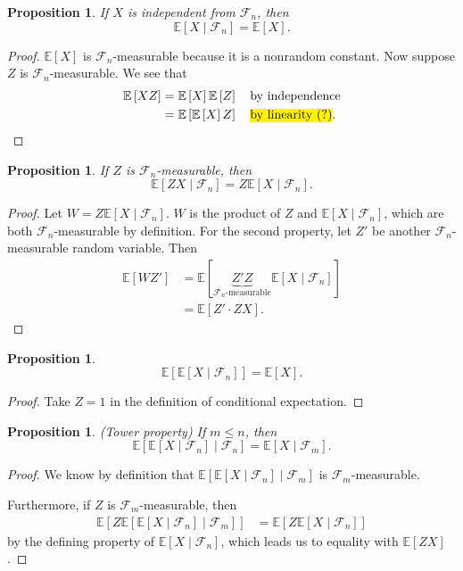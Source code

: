 \documentclass{tufte-handout}
\newcommand*\E{\mathbb{E}}
\newtheorem{prop}[thm]{Proposition}
\theoremstyle{definition}
\begin{document}
\begin{prop}
	If $X$ is independent from $\mathscr{F}_n$, then \[
		\E\left[X \mid \mathscr{F}_n\right]  = \E\left[X\right] 
	.\] 
\end{prop}
\begin{proof}
	$\E\left[X\right]$ is $\mathscr{F}_n$-measurable because it is a nonrandom constant.
	Now suppose $Z$ is $\mathscr{F}_n$-measurable. We see that
	\begin{align*}
		\E\left[XZ\right]  &= \E\left[X\right] \E\left[Z\right] \quad \text{by independence} \\
						   &= \E\left[\E\left[X \right] Z\right] \quad \text{\texthl{by linearity (?)}}
	.\end{align*}
\end{proof}

\begin{prop}
	If $Z$ is $\mathscr{F}_n$-measurable, then \[
		\E\left[ZX \mid \mathscr{F}_n\right] = Z \E\left[X \mid \mathscr{F}_n\right] 
	.\] 
\end{prop}

\begin{proof}
	Let $W = Z \E\left[X \mid \mathscr{F}_n\right] $.
	$W$ is the product of $Z$ and $\E\left[X \mid \mathscr{F}_n\right]$, which are both $\mathscr{F}_n$-measurable by definition.
	For the second property, let $Z'$ be another $\mathscr{F}_n$-measurable random variable. Then 
	\begin{align*}
		\E\left[W Z'\right] &= \E\left[\underbrace{Z' Z}_{\mathscr{F}_n\text{-measurable}} \E\left[X \mid \mathscr{F}_n\right] \right]  \\
		&= \E\left[Z' \cdot ZX\right]
	.\end{align*}
\end{proof}

\begin{prop}
	\[
		\E\left[\E\left[X \mid \mathscr{F}_n\right] \right] = \E\left[X\right] 
	.\] 		
\end{prop}
\begin{proof}
	Take $Z = 1$ in the definition of conditional expectation.
\end{proof}

\begin{prop}
	(Tower property) If $m \le n$, then \[
		\E\left[\E\left[X \mid \mathscr{F}_n\right] \mid \mathscr{F}_n\right] = \E\left[X \mid \mathscr{F}_m\right] 
	.\] 
\end{prop}
\begin{proof}
	We know by definition that $
		\E\left[\E\left[X \mid \mathscr{F}_n\right] \mid \mathscr{F}_m\right] 
	$ is $\mathscr{F}_m$-measurable.

	Furthermore, if $Z$ is $\mathscr{F}_m$-measurable, then
	\begin{align*}
	\E\left[Z \E\left[\E\left[X \mid \mathscr{F}_n\right] \mid \mathscr{F}_m\right] \right] &= \E\left[Z \E\left[X \mid \mathscr{F}_n\right] \right] \end{align*} by the defining property of $\E\left[X \mid \mathscr{F}_n\right] $, which leads us to equality with $\E\left[ZX\right] $.
\end{proof}
\end{document}
